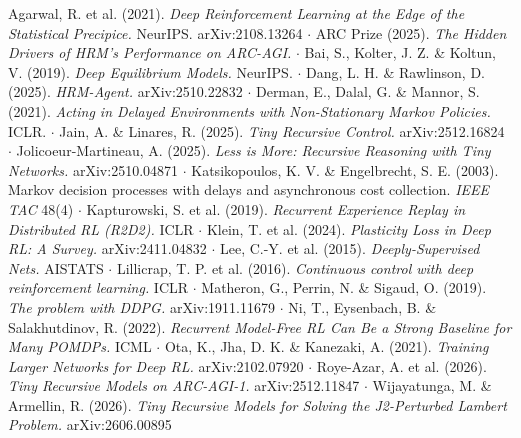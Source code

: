 \documentclass[11pt]{article}
\begin{document}
Agarwal, R. et al. (2021). \emph{Deep Reinforcement Learning at the Edge of the Statistical Precipice.} NeurIPS. arXiv:2108.13264 $\cdot$ ARC Prize (2025). \emph{The Hidden Drivers of HRM's Performance on ARC-AGI.} $\cdot$ Bai, S., Kolter, J. Z. \& Koltun, V. (2019). \emph{Deep Equilibrium Models.} NeurIPS. $\cdot$ Dang, L. H. \& Rawlinson, D. (2025). \emph{HRM-Agent.} arXiv:2510.22832 $\cdot$ Derman, E., Dalal, G. \& Mannor, S. (2021). \emph{Acting in Delayed Environments with Non-Stationary Markov Policies.} ICLR. $\cdot$ Jain, A. \& Linares, R. (2025). \emph{Tiny Recursive Control.} arXiv:2512.16824 $\cdot$ Jolicoeur-Martineau, A. (2025). \emph{Less is More: Recursive Reasoning with Tiny Networks.} arXiv:2510.04871 $\cdot$ Katsikopoulos, K. V. \& Engelbrecht, S. E. (2003). Markov decision processes with delays and asynchronous cost collection. \emph{IEEE TAC} 48(4) $\cdot$ Kapturowski, S. et al. (2019). \emph{Recurrent Experience Replay in Distributed RL (R2D2).} ICLR $\cdot$ Klein, T. et al. (2024). \emph{Plasticity Loss in Deep RL: A Survey.} arXiv:2411.04832 $\cdot$ Lee, C.-Y. et al. (2015). \emph{Deeply-Supervised Nets.} AISTATS $\cdot$ Lillicrap, T. P. et al. (2016). \emph{Continuous control with deep reinforcement learning.} ICLR $\cdot$ Matheron, G., Perrin, N. \& Sigaud, O. (2019). \emph{The problem with DDPG.} arXiv:1911.11679 $\cdot$ Ni, T., Eysenbach, B. \& Salakhutdinov, R. (2022). \emph{Recurrent Model-Free RL Can Be a Strong Baseline for Many POMDPs.} ICML $\cdot$ Ota, K., Jha, D. K. \& Kanezaki, A. (2021). \emph{Training Larger Networks for Deep RL.} arXiv:2102.07920 $\cdot$ Roye-Azar, A. et al. (2026). \emph{Tiny Recursive Models on ARC-AGI-1.} arXiv:2512.11847 $\cdot$ Wijayatunga, M. \& Armellin, R. (2026). \emph{Tiny Recursive Models for Solving the J2-Perturbed Lambert Problem.} arXiv:2606.00895
\end{document}
